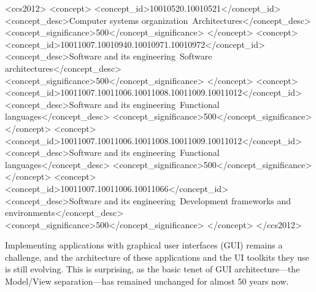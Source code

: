 \documentclass[sigplan,screen]{acmart}
\begin{document}
\begin{CCSXML}
<ccs2012>
   <concept>
       <concept_id>10010520.10010521</concept_id>
       <concept_desc>Computer systems organization~Architectures</concept_desc>
       <concept_significance>500</concept_significance>
       </concept>
   <concept>
       <concept_id>10011007.10010940.10010971.10010972</concept_id>
       <concept_desc>Software and its engineering~Software architectures</concept_desc>
       <concept_significance>500</concept_significance>
       </concept>
   <concept>
       <concept_id>10011007.10011006.10011008.10011009.10011012</concept_id>
       <concept_desc>Software and its engineering~Functional languages</concept_desc>
       <concept_significance>500</concept_significance>
       </concept>
   <concept>
       <concept_id>10011007.10011006.10011008.10011009.10011012</concept_id>
       <concept_desc>Software and its engineering~Functional languages</concept_desc>
       <concept_significance>500</concept_significance>
       </concept>
    <concept>
        <concept_id>10011007.10011006.10011066</concept_id>
        <concept_desc>Software and its engineering~Development frameworks and environments</concept_desc>
        <concept_significance>500</concept_significance>
    </concept>
</ccs2012>
\end{CCSXML}



\maketitle

Implementing applications with graphical user interfaces (GUI) remains
a challenge, and the architecture of these applications and the UI
toolkits they use is still evolving.  This is surprising, as the basic
tenet of GUI architecture---the Model/View separation---has remained
unchanged for almost 50 years now.
\end{document}

